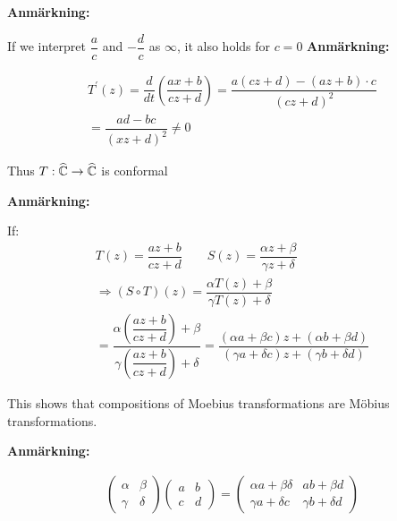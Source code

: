 \par\bigskip
\noindent\textbf{Anmärkning:}\par
\noindent If we interpret $\dfrac{a}{c}$ and $-\dfrac{d}{c}$ as $\infty$, it also holds for $c=0$
\newpage
\noindent\textbf{Anmärkning:}\par
\begin{equation*}
  \begin{gathered}
    T^{\prime}(z) = \dfrac{d}{dt}\left(\dfrac{ax+b}{cz+d}\right) = \dfrac{a(cz+d)-(az+b)\cdot c}{(cz+d)^2}\\
    = \dfrac{ad-bc}{(xz+d)^2}\neq0
  \end{gathered}
\end{equation*}\par
\noindent Thus $T:\widehat{\mathbb{C}}\to\widehat{\mathbb{C}}$ is conformal
\par\bigskip
\noindent\textbf{Anmärkning:}\par
\noindent If:
\begin{equation*}
  \begin{gathered}
    T(z) = \dfrac{az+b}{cz+d}\qquad S(z) = \dfrac{\alpha z+\beta}{\gamma z+\delta}\\
    \Rightarrow (S\circ T)(z) = \dfrac{\alpha T(z)+\beta}{\gamma T(z)+\delta}\\
    = \dfrac{\alpha\left(\dfrac{az+b}{cz+d}\right)+\beta}{\gamma\left(\dfrac{az+b}{cz+d}\right)+\delta} = \dfrac{(\alpha a+\beta c)z+(\alpha b+\beta d)}{(\gamma a+\delta c)z+(\gamma b+\delta d)}
  \end{gathered}
\end{equation*}
\par\bigskip
\noindent This shows that compositions of Moebius transformations are Möbius transformations.
\par\bigskip
\noindent\textbf{Anmärkning:}\par
\begin{equation*}
  \begin{gathered}
    \begin{pmatrix}\alpha&\beta\\\gamma&\delta\end{pmatrix}\begin{pmatrix}a&b\\c&d\end{pmatrix} = \begin{pmatrix}\alpha a+\beta\delta&ab+\beta d\\\gamma a+\delta c &\gamma b+\delta d\end{pmatrix}
  \end{gathered}
\end{equation*}
